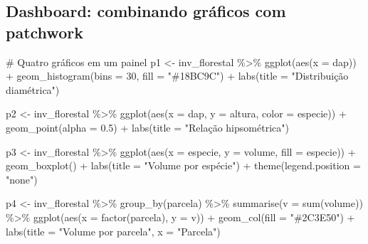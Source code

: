 \documentclass[
  letterpaper,
]{scrbook}
\newenvironment{Shaded}{\begin{snugshade}}{\end{snugshade}}
\newcommand{\AttributeTok}[1]{\textcolor[rgb]{0.40,0.45,0.13}{#1}}
\newcommand{\CommentTok}[1]{\textcolor[rgb]{0.37,0.37,0.37}{#1}}
\newcommand{\DecValTok}[1]{\textcolor[rgb]{0.68,0.00,0.00}{#1}}
\newcommand{\FloatTok}[1]{\textcolor[rgb]{0.68,0.00,0.00}{#1}}
\newcommand{\FunctionTok}[1]{\textcolor[rgb]{0.28,0.35,0.67}{#1}}
\newcommand{\NormalTok}[1]{\textcolor[rgb]{0.00,0.23,0.31}{#1}}
\newcommand{\OtherTok}[1]{\textcolor[rgb]{0.00,0.23,0.31}{#1}}
\newcommand{\SpecialCharTok}[1]{\textcolor[rgb]{0.37,0.37,0.37}{#1}}
\newcommand{\StringTok}[1]{\textcolor[rgb]{0.13,0.47,0.30}{#1}}
\newcounter{none} %
\begin{document}
\subsection{Dashboard: combinando gráficos com
patchwork}\label{dashboard-combinando-gruxe1ficos-com-patchwork}

\begin{Shaded}
\begin{Highlighting}[]
\CommentTok{\# Quatro gráficos em um painel}
\NormalTok{p1 }\OtherTok{\textless{}{-}}\NormalTok{ inv\_florestal }\SpecialCharTok{\%\textgreater{}\%}
  \FunctionTok{ggplot}\NormalTok{(}\FunctionTok{aes}\NormalTok{(}\AttributeTok{x =}\NormalTok{ dap)) }\SpecialCharTok{+} \FunctionTok{geom\_histogram}\NormalTok{(}\AttributeTok{bins =} \DecValTok{30}\NormalTok{, }\AttributeTok{fill =} \StringTok{"\#18BC9C"}\NormalTok{) }\SpecialCharTok{+} \FunctionTok{labs}\NormalTok{(}\AttributeTok{title =} \StringTok{"Distribuição diamétrica"}\NormalTok{)}

\NormalTok{p2 }\OtherTok{\textless{}{-}}\NormalTok{ inv\_florestal }\SpecialCharTok{\%\textgreater{}\%}
  \FunctionTok{ggplot}\NormalTok{(}\FunctionTok{aes}\NormalTok{(}\AttributeTok{x =}\NormalTok{ dap, }\AttributeTok{y =}\NormalTok{ altura, }\AttributeTok{color =}\NormalTok{ especie)) }\SpecialCharTok{+} \FunctionTok{geom\_point}\NormalTok{(}\AttributeTok{alpha =} \FloatTok{0.5}\NormalTok{) }\SpecialCharTok{+} \FunctionTok{labs}\NormalTok{(}\AttributeTok{title =} \StringTok{"Relação hipsométrica"}\NormalTok{)}

\NormalTok{p3 }\OtherTok{\textless{}{-}}\NormalTok{ inv\_florestal }\SpecialCharTok{\%\textgreater{}\%}
  \FunctionTok{ggplot}\NormalTok{(}\FunctionTok{aes}\NormalTok{(}\AttributeTok{x =}\NormalTok{ especie, }\AttributeTok{y =}\NormalTok{ volume, }\AttributeTok{fill =}\NormalTok{ especie)) }\SpecialCharTok{+} \FunctionTok{geom\_boxplot}\NormalTok{() }\SpecialCharTok{+} \FunctionTok{labs}\NormalTok{(}\AttributeTok{title =} \StringTok{"Volume por espécie"}\NormalTok{) }\SpecialCharTok{+} \FunctionTok{theme}\NormalTok{(}\AttributeTok{legend.position =} \StringTok{"none"}\NormalTok{)}

\NormalTok{p4 }\OtherTok{\textless{}{-}}\NormalTok{ inv\_florestal }\SpecialCharTok{\%\textgreater{}\%}
  \FunctionTok{group\_by}\NormalTok{(parcela) }\SpecialCharTok{\%\textgreater{}\%} \FunctionTok{summarise}\NormalTok{(}\AttributeTok{v =} \FunctionTok{sum}\NormalTok{(volume)) }\SpecialCharTok{\%\textgreater{}\%}
  \FunctionTok{ggplot}\NormalTok{(}\FunctionTok{aes}\NormalTok{(}\AttributeTok{x =} \FunctionTok{factor}\NormalTok{(parcela), }\AttributeTok{y =}\NormalTok{ v)) }\SpecialCharTok{+} \FunctionTok{geom\_col}\NormalTok{(}\AttributeTok{fill =} \StringTok{"\#2C3E50"}\NormalTok{) }\SpecialCharTok{+} \FunctionTok{labs}\NormalTok{(}\AttributeTok{title =} \StringTok{"Volume por parcela"}\NormalTok{, }\AttributeTok{x =} \StringTok{"Parcela"}\NormalTok{)}


\end{Highlighting}
\end{Shaded}
\end{document}
